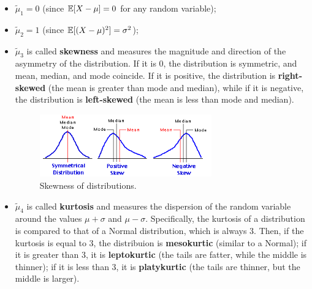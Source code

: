\begin{itemize}
    \item $\tilde{\mu}_1 = 0$ (since $\mathbb{E}[X - \mu] = 0$ for any random variable);
    \item $\tilde{\mu}_2 = 1$ (since $\mathbb{E}[(X - \mu)^2] = \sigma^2$);
    \item $\tilde{\mu}_3$ is called \textbf{skewness} and measures the magnitude and direction of the asymmetry of the distribution. If it is 0, the distribution is symmetric, and mean, median, and mode coincide. If it is positive, the distribution is \textbf{right-skewed} (the mean is greater than mode and median), while if it is negative, the distribution is \textbf{left-skewed} (the mean is less than mode and median).
    \begin{figure}[ht]
        \centering
        \includegraphics[width=0.7\textwidth]{img/skew.png}
        \caption{Skewness of distributions.}
    \end{figure}
    \item $\tilde{\mu}_4$ is called \textbf{kurtosis} and measures the dispersion of the random variable around the values $\mu+\sigma$ and $\mu - \sigma$. Specifically, the kurtosis of a distribution is compared to that of a Normal distribution, which is always 3. Then, if the kurtosis is equal to 3, the distribuion is \textbf{mesokurtic} (similar to a Normal); if it is greater than 3, it is \textbf{leptokurtic} (the tails are fatter, while the middle is thinner); if it is less than 3, it is \textbf{platykurtic} (the tails are thinner, but the middle is larger).
\end{itemize}